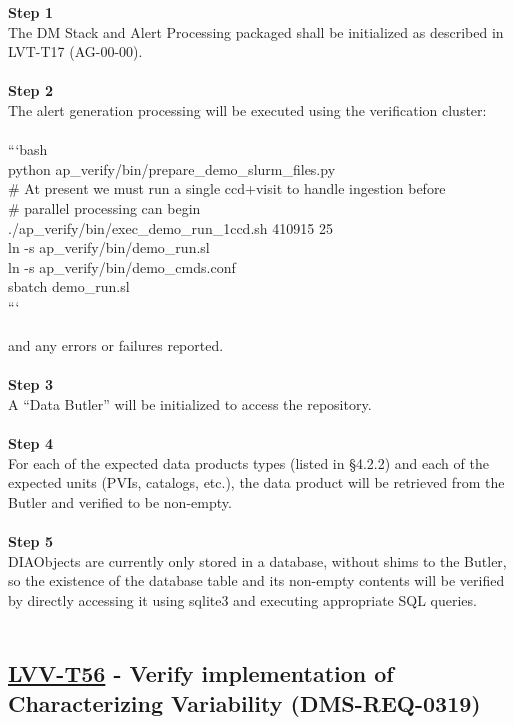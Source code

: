 \textbf{Step 1}\\
The DM Stack and Alert Processing packaged shall be initialized as
described in LVT-T17 (AG-00-00).\\
~\\
\textbf{Step 2}\\
The alert generation processing will be executed using the verification
cluster:\\
~\\
```bash\\
python ap\_verify/bin/prepare\_demo\_slurm\_files.py\\
\# At present we must run a single ccd+visit to handle ingestion
before\\
\# parallel processing can begin\\
./ap\_verify/bin/exec\_demo\_run\_1ccd.sh 410915 25\\
ln -s ap\_verify/bin/demo\_run.sl\\
ln -s ap\_verify/bin/demo\_cmds.conf\\
sbatch demo\_run.sl\\
```\\
~\\
and any errors or failures reported.\\
~\\
\textbf{Step 3}\\
A ``Data Butler'' will be initialized to access the repository.\\
~\\
\textbf{Step 4}\\
For each of the expected data products types (listed in §4.2.2) and each
of the expected units (PVIs, catalogs, etc.), the data product will be
retrieved from the Butler and verified to be non-empty.\\
~\\
\textbf{Step 5}\\
DIAObjects are currently only stored in a database, without shims to the
Butler, so the existence of the database table and its non-empty
contents will be verified by directly accessing it using sqlite3 and
executing appropriate SQL queries.\\
~\\

\hypertarget{lvv-t56---verify-implementation-of-characterizing-variability-dms-req-0319}{%
\subsection{\texorpdfstring{\href{https://jira.lsstcorp.org/secure/Tests.jspa\#/testCase/LVV-T56}{LVV-T56}
- Verify implementation of Characterizing Variability
(DMS-REQ-0319)}{LVV-T56 - Verify implementation of Characterizing Variability (DMS-REQ-0319)}}\label{lvv-t56---verify-implementation-of-characterizing-variability-dms-req-0319}}

